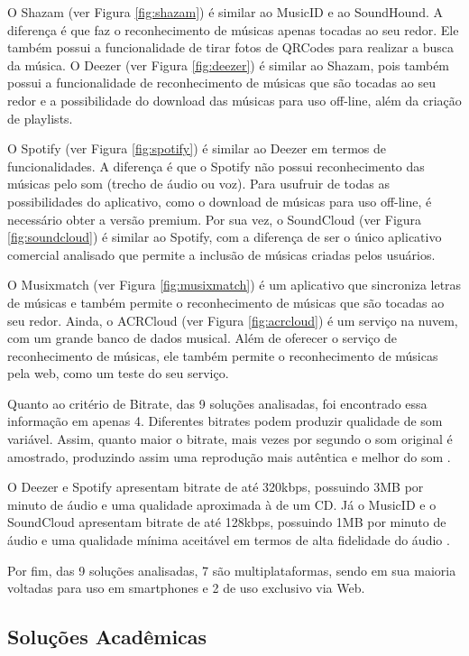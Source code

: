 O Shazam (ver Figura \ref{fig:shazam}) é similar ao MusicID e ao SoundHound. A diferença é que faz o reconhecimento de músicas apenas tocadas ao seu redor. Ele também possui a funcionalidade de tirar fotos de QRCodes para realizar a busca da música. O Deezer (ver Figura \ref{fig:deezer}) é similar ao Shazam, pois também possui a funcionalidade de reconhecimento de músicas que são tocadas ao seu redor e a possibilidade do download das músicas para uso off-line, além da criação de playlists.

O Spotify (ver Figura \ref{fig:spotify}) é similar ao Deezer em termos de funcionalidades. A diferença é que o Spotify não possui reconhecimento das músicas pelo som (trecho de áudio ou voz). Para usufruir de todas as possibilidades do aplicativo, como o download de músicas para uso off-line, é necessário obter a versão premium. Por sua vez, o SoundCloud (ver Figura \ref{fig:soundcloud}) é similar ao Spotify, com a diferença de ser o único aplicativo comercial analisado que permite a inclusão de músicas criadas pelos usuários.

O Musixmatch (ver Figura \ref{fig:musixmatch}) é um aplicativo que sincroniza letras de músicas e também permite o reconhecimento de músicas que são tocadas ao seu redor. Ainda, o ACRCloud (ver Figura \ref{fig:acrcloud}) é um serviço na nuvem, com um grande banco de dados musical. Além de oferecer o serviço de reconhecimento de músicas, ele também permite o reconhecimento de músicas pela web, como um teste do seu serviço.

Quanto ao critério de Bitrate, das 9 soluções analisadas, foi encontrado essa informação em apenas 4. Diferentes bitrates podem produzir qualidade de som variável. Assim, quanto maior o bitrate, mais vezes por segundo o som original é amostrado, produzindo assim uma reprodução mais autêntica e melhor do som \cite{sandisk}.

O Deezer e Spotify apresentam bitrate de até 320kbps, possuindo 3MB por minuto de áudio e uma qualidade aproximada à de um CD. Já o MusicID e o SoundCloud apresentam bitrate de até 128kbps, possuindo 1MB por minuto de áudio e uma qualidade mínima aceitável em termos de alta fidelidade do áudio \cite{sean2012}.

Por fim, das 9 soluções analisadas, 7 são multiplataformas, sendo em sua maioria voltadas para uso em smartphones e 2 de uso exclusivo via Web.


\subsection{Soluções Acadêmicas}

